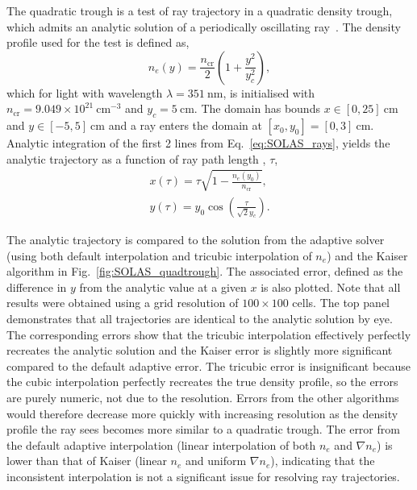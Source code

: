 The quadratic trough is a test of ray trajectory in a quadratic density trough, which admits an analytic solution of a periodically oscillating ray~\cite{kaiser_laser_2000,haines_coupling_2020}.
The density profile used for the test is defined as,
\begin{equation}
    n_e(y) = \frac{n_{\text{cr}}}{2} \left( 1 + \frac{y^2}{y_c^2} \right),
\end{equation}
which for light with wavelength $\lambda=351\ \text{nm}$, is initialised with $n_{\text{cr}} = 9.049\times 10^{21} \ \text{cm}^{-3}$ and $y_c = 5 \ \text{cm}$.
The domain has bounds $x \in [0,25]\ \text{cm}$ and $y \in [-5,5]\ \text{cm}$ and a ray enters the domain at $[x_0,y_0]=[0,3]\ \text{cm}$.
Analytic integration of the first 2 lines from Eq.~\ref{eq:SOLAS_rays}, yields the analytic trajectory as a function of ray path length , $\tau$,
\begin{equation}
    \begin{gathered}
        x(\tau) = \tau\sqrt{1-\frac{n_e(y_0)}{n_{\text{cr}}}}, \\
        y(\tau) = y_0\cos{\left( \frac{\tau}{\sqrt{2}y_c} \right)}.
    \end{gathered}
\end{equation}

The analytic trajectory is compared to the solution from the adaptive solver (using both default interpolation and tricubic interpolation of $n_e$) and the Kaiser algorithm in Fig.~\ref{fig:SOLAS_quadtrough}.
The associated error, defined as the difference in $y$ from the analytic value at a given $x$ is also plotted.
Note that all results were obtained using a grid resolution of $100\times100$ cells.
The top panel demonstrates that all trajectories are identical to the analytic solution by eye.
The corresponding errors show that the tricubic interpolation effectively perfectly recreates the analytic solution and the Kaiser error is slightly more significant compared to the default adaptive error.
The tricubic error is insignificant because the cubic interpolation perfectly recreates the true density profile, so the errors are purely numeric, not due to the resolution.
Errors from the other algorithms would therefore decrease more quickly with increasing resolution as the density profile the ray sees becomes more similar to a quadratic trough.
The error from the default adaptive interpolation (linear interpolation of both $n_e$ and $\nabla n_e$) is lower than that of Kaiser (linear $n_e$ and uniform $\nabla n_e$), indicating that the inconsistent interpolation is not a significant issue for resolving ray trajectories.

